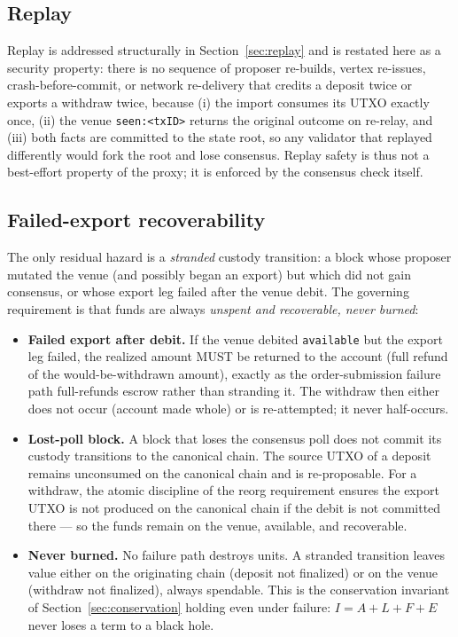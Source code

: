 \subsection{Replay}

Replay is addressed structurally in Section~\ref{sec:replay} and is
restated here as a security property: there is no sequence of proposer
re-builds, vertex re-issues, crash-before-commit, or network
re-delivery that credits a deposit twice or exports a withdraw twice,
because (i) the import consumes its UTXO exactly once, (ii) the venue
\texttt{seen:<txID>} returns the original outcome on re-relay, and (iii)
both facts are committed to the state root, so any validator that
replayed differently would fork the root and lose consensus. Replay
safety is thus not a best-effort property of the proxy; it is enforced
by the consensus check itself.

\subsection{Failed-export recoverability}
\label{sec:strand}

The only residual hazard is a \emph{stranded} custody transition: a
block whose proposer mutated the venue (and possibly began an export)
but which did not gain consensus, or whose export leg failed after the
venue debit. The governing requirement is that funds are always
\emph{unspent and recoverable, never burned}:

\begin{itemize}[leftmargin=2em,nosep]
\item \textbf{Failed export after debit.} If the venue debited
  \texttt{available} but the export leg failed, the realized amount MUST
  be returned to the account (full refund of the would-be-withdrawn
  amount), exactly as the order-submission failure path full-refunds
  escrow rather than stranding it. The withdraw then either does not
  occur (account made whole) or is re-attempted; it never half-occurs.
\item \textbf{Lost-poll block.} A block that loses the consensus poll
  does not commit its custody transitions to the canonical chain. The
  source UTXO of a deposit remains unconsumed on the canonical chain and
  is re-proposable. For a withdraw, the atomic discipline of the reorg
  requirement ensures the export UTXO is not produced on the canonical
  chain if the debit is not committed there --- so the funds remain on
  the venue, available, and recoverable.
\item \textbf{Never burned.} No failure path destroys units. A stranded
  transition leaves value either on the originating chain (deposit not
  finalized) or on the venue (withdraw not finalized), always spendable.
  This is the conservation invariant of Section~\ref{sec:conservation}
  holding even under failure: $I = A + L + F + E$ never loses a term to
  a black hole.
\end{itemize}

